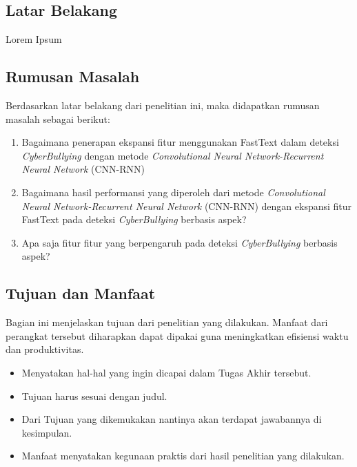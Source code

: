 \documentclass{thesis}
\begin{document}
%

\addalllist{}


\subsection{Latar Belakang}

Lorem Ipsum

\subsection{Rumusan Masalah}

Berdasarkan latar belakang dari penelitian ini, maka didapatkan rumusan masalah sebagai berikut:
\begin{enumerate}
   \item Bagaimana penerapan ekspansi fitur menggunakan FastText dalam deteksi \textit{CyberBullying} dengan metode \textit{Convolutional Neural Network-Recurrent Neural Network} (CNN-RNN)  
   \item Bagaimana hasil performansi yang diperoleh dari metode \textit{Convolutional Neural Network-Recurrent Neural Network} (CNN-RNN) dengan ekspansi fitur FastText pada deteksi \textit{CyberBullying} berbasis aspek?
   \item Apa saja fitur fitur yang berpengaruh pada deteksi \textit{CyberBullying} berbasis aspek?
\end{enumerate} 

\subsection{Tujuan dan Manfaat}

Bagian ini menjelaskan tujuan dari penelitian yang dilakukan. Manfaat dari perangkat tersebut diharapkan dapat dipakai guna meningkatkan efisiensi waktu dan produktivitas.

\renewcommand{\labelitemi}{\textbullet}
\begin{itemize}
    \item Menyatakan hal-hal yang ingin dicapai dalam Tugas Akhir tersebut.
    \item Tujuan harus sesuai dengan judul.
    \item Dari Tujuan yang dikemukakan nantinya akan terdapat jawabannya di kesimpulan.
    \item Manfaat menyatakan kegunaan praktis dari hasil penelitian yang dilakukan.
\end{itemize}
\end{document}

